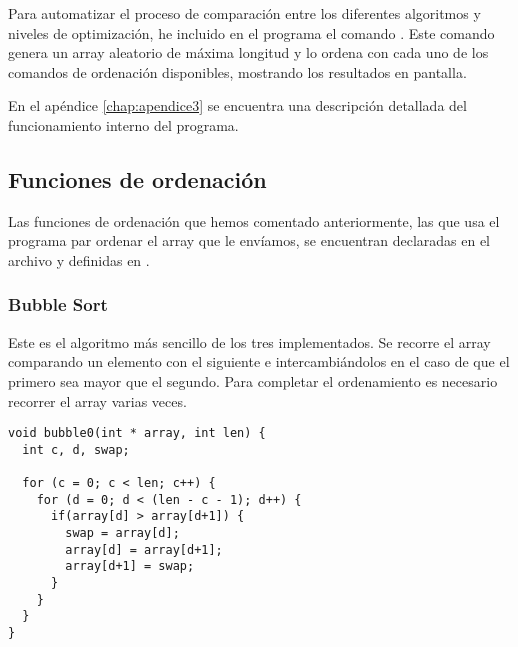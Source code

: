 Para automatizar el proceso de comparación entre los diferentes algoritmos y niveles de optimización, he incluido en el programa el comando . Este comando genera un array aleatorio de máxima longitud y lo ordena con cada uno de los comandos de ordenación disponibles, mostrando los resultados en pantalla.

En el apéndice \ref{chap:apendice3} se encuentra una descripción detallada del funcionamiento interno del programa.

\subsection{Funciones de ordenación}
Las funciones de ordenación que hemos comentado anteriormente, las que usa el programa par ordenar el array que le envíamos, se encuentran declaradas en el archivo  y definidas en .

\subsubsection{Bubble Sort}
Este es el algoritmo más sencillo de los tres implementados. Se recorre el array comparando un elemento con el siguiente e intercambiándolos en el caso de que el primero sea mayor que el segundo. Para completar el ordenamiento es necesario recorrer el array varias veces.
\begin{lstlisting}[caption=Implementación de Bubble Sort]
void bubble0(int * array, int len) {
  int c, d, swap;

  for (c = 0; c < len; c++) {
    for (d = 0; d < (len - c - 1); d++) {
      if(array[d] > array[d+1]) {
        swap = array[d];
        array[d] = array[d+1];
        array[d+1] = swap;
      }
    }
  }
}  
\end{lstlisting}\label{Implementación de Bubble Sort en nuestro programa}

